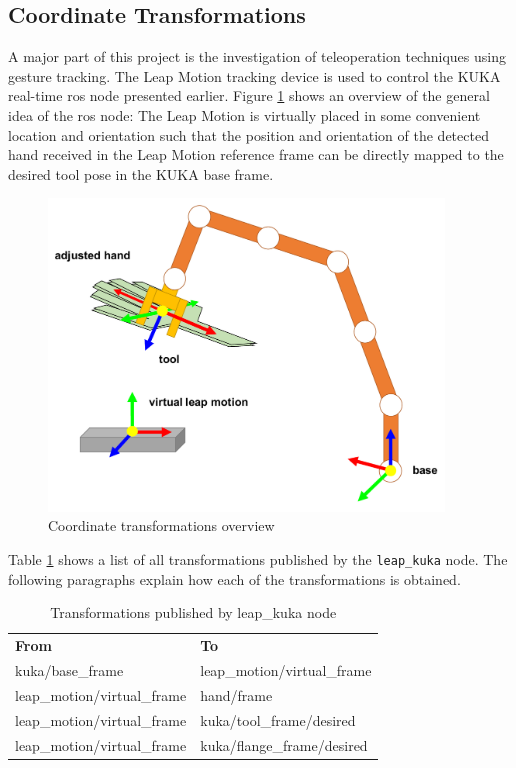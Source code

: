 \documentclass[headsepline,footinclude=false,fontsize=11pt,paper=a4,listof=totoc,bibliography=totoc,BCOR=12mm,DIV=14]{scrbook}
\begin{document}
\subsection{Coordinate Transformations}

A major part of this project is the investigation of teleoperation techniques using gesture tracking. The Leap Motion tracking device is used to control the KUKA real-time \gls{ros} node presented earlier. Figure \ref{fig:overview_coosys} shows an overview of the general idea of the \gls{ros} node: The Leap Motion is virtually placed in some convenient location and orientation such that the position and orientation of the detected hand received in the Leap Motion reference frame can be directly mapped to the desired tool pose in the KUKA base frame.

\begin{figure}[h]
    \centering
    \includegraphics[width=10.5cm]{images/coosy_overview}
    \caption{Coordinate transformations overview}
    \label{fig:overview_coosys}
\end{figure}

\newpage
Table \ref{tab:transforms} shows a list of all transformations published by the \texttt{leap\_kuka} node. The following paragraphs explain how each of the transformations is obtained.

\begin{table}[h]
\centering
\begin{tabular}{ll}
\textbf{From}               & \textbf{To}                 \\
kuka/base\_frame            & leap\_motion/virtual\_frame \\
leap\_motion/virtual\_frame & hand/frame                  \\
leap\_motion/virtual\_frame & kuka/tool\_frame/desired    \\
leap\_motion/virtual\_frame & kuka/flange\_frame/desired 
\end{tabular}
\caption{Transformations published by leap\_kuka node}
\label{tab:transforms}
\end{table}
\end{document}
